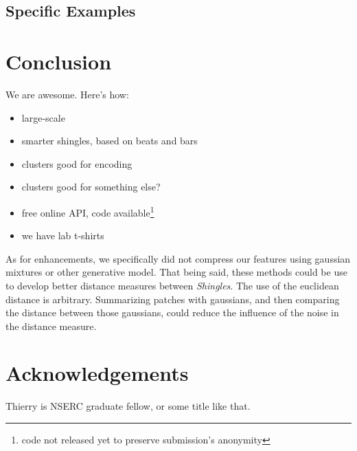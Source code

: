 \documentclass{article}
\begin{document}
\subsection{Specific Examples}


\section{Conclusion}
We are awesome. Here's how:
\begin{itemize}
\item large-scale
\item smarter shingles, based on beats and bars
\item clusters good for encoding
\item clusters good for something else?
\item free online API, code available\footnote{code not released yet to preserve 
submission's anonymity}
\item we have lab t-shirts
\end{itemize}

As for enhancements, we specifically did not compress our features using
gaussian mixtures or other generative model. That being said, these methods
could be use to develop better distance measures between \textit{Shingles}.
The use of the euclidean distance is arbitrary. Summarizing patches
with gaussians, and then comparing the distance between those gaussians,
could reduce the influence of the noise in the distance measure.



\small
\section{Acknowledgements}
Thierry is NSERC graduate fellow, or some title like that.




\end{document}
